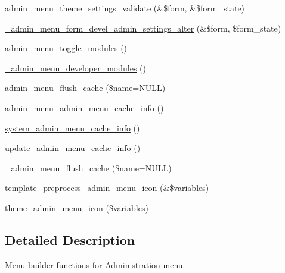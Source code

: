 \begin{DoxyCompactItemize}
\item 
\hyperlink{admin__menu_8inc_a773e8076793591c82ba893436f46153c}{admin\_\-menu\_\-theme\_\-settings\_\-validate} (\&\$form, \&\$form\_\-state)
\item 
\hyperlink{admin__menu_8inc_aa78509bb044821faf77cf6624bd726f8}{\_\-admin\_\-menu\_\-form\_\-devel\_\-admin\_\-settings\_\-alter} (\&\$form, \$form\_\-state)
\item 
\hyperlink{admin__menu_8inc_ab2b3513df09bbd7a3deae15086d4898e}{admin\_\-menu\_\-toggle\_\-modules} ()
\item 
\hyperlink{admin__menu_8inc_adc75f56f673a11494a4ed92d15e04cdf}{\_\-admin\_\-menu\_\-developer\_\-modules} ()
\item 
\hyperlink{admin__menu_8inc_a954c039363bc1ce4c1fa1260f4f107e2}{admin\_\-menu\_\-flush\_\-cache} (\$name=NULL)
\item 
\hyperlink{admin__menu_8inc_a9a83be386880f46f5f31e08be2529b51}{admin\_\-menu\_\-admin\_\-menu\_\-cache\_\-info} ()
\item 
\hyperlink{admin__menu_8inc_addfcc1ff94f62409d4ff7fa7f523aa45}{system\_\-admin\_\-menu\_\-cache\_\-info} ()
\item 
\hyperlink{admin__menu_8inc_a244f8c73c3414cbf1d9ec52f2fd65fbc}{update\_\-admin\_\-menu\_\-cache\_\-info} ()
\item 
\hyperlink{admin__menu_8inc_a34a792a4ac923bf39cf8e8f87fb92124}{\_\-admin\_\-menu\_\-flush\_\-cache} (\$name=NULL)
\item 
\hyperlink{admin__menu_8inc_af696ca093076e195d86786d7516ee9df}{template\_\-preprocess\_\-admin\_\-menu\_\-icon} (\&\$variables)
\item 
\hyperlink{group__themeable_gab93751624cbfa203208fba5c90192ee1}{theme\_\-admin\_\-menu\_\-icon} (\$variables)
\end{DoxyCompactItemize}


\subsection{Detailed Description}
Menu builder functions for Administration menu. 

